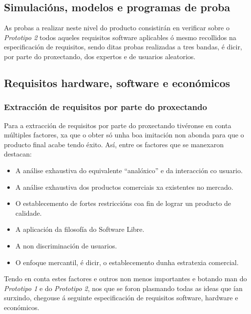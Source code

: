  \subsection{Simulacións, modelos e programas de proba}

 As probas a realizar neste nivel do producto consistirán en verificar sobre o
 \textit{Prototipo 2} todos aqueles requisitos software aplicables ó mesmo
 recollidos na especificación de requisitos, sendo ditas probas realizadas a
 tres bandas, é dicir, por parte do proxectando, dos expertos e de usuarios
 aleatorios.

 \subsection{Requisitos hardware, software e económicos}

  \subsubsection{Extracción de requisitos por parte do proxectando}

  Para a extracción de requisitos por parte do proxectando tivéronse en conta
  múltiples factores, xa que o obter só unha boa imitación non abonda para que
  o producto final acabe tendo éxito. Así, entre os factores que se manexaron
  destacan:

  \begin{itemize}
   \item A análise exhaustiva do equivalente ``analóxico'' e da interacción co
         usuario.
   \item A análise exhaustiva dos productos comerciais xa existentes no
         mercado.
   \item O establecemento de fortes restriccións coa fin de lograr un producto
         de calidade.
   \item A aplicación da filosofía do Software Libre.
   \item A non discriminación de usuarios.
   \item O enfoque mercantil, é dicir, o establecemento dunha estratexia
         comercial.
  \end{itemize}

  Tendo en conta estes factores e outros non menos importantes e botando man do
  \textit{Prototipo 1} e do \textit{Prototipo 2}, nos que se foron plasmando
  todas as ideas que ían surxindo, chegouse á seguinte especificación de
  requisitos software, hardware e económicos.

